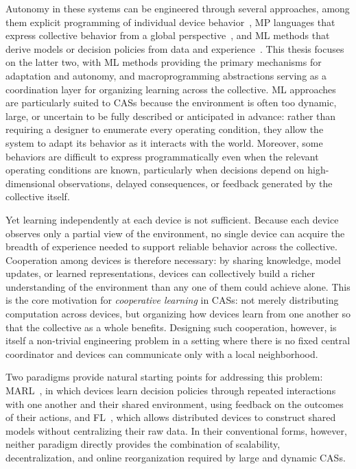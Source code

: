 Autonomy in these systems can be engineered through several approaches,
 among them explicit programming of individual device behavior~\cite{DBLP:journals/aamas/BrescianiPGGM04},
 \gls{MP} languages that express collective behavior from a global perspective~\cite{DBLP:journals/csur/Casadei23,DBLP:journals/tomacs/ViroliABDP18},
 and \gls{ML} methods that derive models or decision policies from data and experience~\cite{DBLP:conf/icml/ZhangYBH18,DBLP:conf/icml/YangLLZZWY18}.
%
This thesis focuses on the latter two, 
 with \gls{ML} methods providing the primary mechanisms for adaptation and autonomy,
 and macroprogramming abstractions serving as a coordination layer 
 for organizing learning across the collective.
%
\gls{ML} approaches are particularly suited to \glspl{CAS}
 because the environment is often too dynamic, large, or uncertain
 to be fully described or anticipated in advance:
 rather than requiring a designer to enumerate every operating condition,
 they allow the system to adapt its behavior as it interacts with the world.
%
Moreover, 
 some behaviors are difficult to express programmatically even when the relevant operating conditions are known,
 particularly when decisions depend on high-dimensional observations, delayed consequences, 
 or feedback generated by the collective itself.

Yet learning independently at each device is not sufficient.
%
Because each device observes only a partial view of the environment,
 no single device can acquire the breadth of experience
 needed to support reliable behavior across the collective.
%
Cooperation among devices is therefore necessary:
 by sharing knowledge, model updates, or learned representations,
 devices can collectively build a richer understanding of the environment
 than any one of them could achieve alone.
%
This is the core motivation for \emph{cooperative learning} in \glspl{CAS}:
 not merely distributing computation across devices,
 but organizing how devices learn from one another
 so that the collective as a whole benefits.
%
Designing such cooperation, however, is itself a non-trivial engineering problem
 in a setting where there is no fixed central coordinator
 and devices can communicate only with a local neighborhood.

Two paradigms provide natural starting points for addressing this problem:
 \gls{MARL}~\cite{DBLP:journals/corr/abs-1911-10635},
 in which devices learn decision policies through repeated interactions
 with one another and their shared environment, using feedback on the outcomes
 of their actions,
 and \gls{FL}~\cite{DBLP:conf/aistats/McMahanMRHA17},
 which allows distributed devices to construct shared models
 without centralizing their raw data.
%
In their conventional forms, however, neither paradigm directly provides the
combination of scalability, decentralization, and online reorganization required
by large and dynamic \glspl{CAS}.


